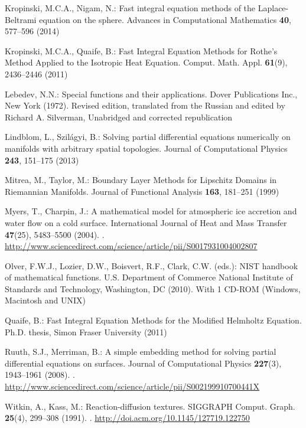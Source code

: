 \begin{thebibliography}{10}
Kropinski, M.C.A., Nigam, N.: {Fast integral equation methods of the
  Laplace-Beltrami equation on the sphere}.
\newblock Advances in Computational Mathematics \textbf{40}, 577--596 (2014)

Kropinski, M.C.A., Quaife, B.: {Fast Integral Equation Methods for Rothe's
  Method Applied to the Isotropic Heat Equation}.
\newblock Comput. Math. Appl. \textbf{61}(9), 2436--2446 (2011)

Lebedev, N.N.: Special functions and their applications.
\newblock Dover Publications Inc., New York (1972).
\newblock Revised edition, translated from the Russian and edited by Richard A.
  Silverman, Unabridged and corrected republication

Lindblom, L., Szil\'{a}gyi, B.: {Solving partial differential equations
  numerically on manifolds with arbitrary spatial topologies}.
\newblock Journal of Computational Physics \textbf{243}, 151--175 (2013)

Mitrea, M., Taylor, M.: {Boundary Layer Methods for Lipschitz Domains in
  Riemannian Manifolds}.
\newblock Journal of Functional Analysis \textbf{163}, 181--251 (1999)

Myers, T., Charpin, J.: A mathematical model for atmospheric ice accretion and
  water flow on a cold surface.
\newblock International Journal of Heat and Mass Transfer \textbf{47}(25),
  5483--5500 (2004).
\newblock {}.
\newblock
  \urlprefix\url{http://www.sciencedirect.com/science/article/pii/S0017931004002807}

Olver, F.W.J., Lozier, D.W., Boisvert, R.F., Clark, C.W. (eds.): N{IST}
  handbook of mathematical functions.
\newblock U.S. Department of Commerce National Institute of Standards and
  Technology, Washington, DC (2010).
\newblock With 1 CD-ROM (Windows, Macintosh and UNIX)

Quaife, B.: {Fast Integral Equation Methods for the Modified Helmholtz
  Equation}.
\newblock Ph.D. thesis, Simon Fraser University (2011)

Ruuth, S.J., Merriman, B.: A simple embedding method for solving partial
  differential equations on surfaces.
\newblock Journal of Computational Physics \textbf{227}(3), 1943--1961 (2008).
\newblock {}.
\newblock
  \urlprefix\url{http://www.sciencedirect.com/science/article/pii/S002199910700441X}

Witkin, A., Kass, M.: Reaction-diffusion textures.
\newblock SIGGRAPH Comput. Graph. \textbf{25}(4), 299--308 (1991).
\newblock {}.
\newblock \urlprefix\url{http://doi.acm.org/10.1145/127719.122750}

\end{thebibliography}





